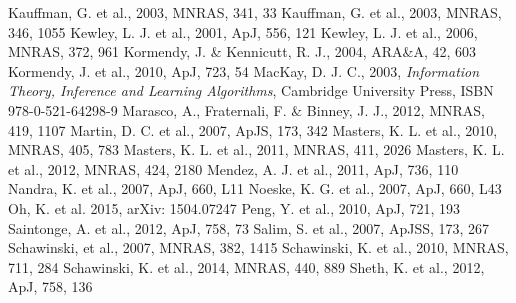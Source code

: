 \documentclass[useAMS,usenatbib]{mn2e}
\begin{document}
\begin{thebibliography}{}
 Kauffman, G. et al., 2003, MNRAS, 341, 33
 Kauffman, G. et al., 2003, MNRAS, 346, 1055
 Kewley, L. J. et al., 2001, ApJ, 556, 121
 Kewley, L. J. et al., 2006, MNRAS, 372, 961
 Kormendy, J. \& Kennicutt, R. J., 2004, ARA\&A, 42, 603
 Kormendy, J. et al., 2010, ApJ, 723, 54
 MacKay, D. J. C., 2003, \emph{Information Theory, Inference and Learning Algorithms}, Cambridge University Press, ISBN 978-0-521-64298-9
 Marasco, A., Fraternali, F. \& Binney, J. J., 2012, MNRAS, 419, 1107
 Martin, D. C. et al., 2007, ApJS, 173, 342
 Masters, K. L. et al., 2010, MNRAS, 405, 783
 Masters, K. L. et al., 2011, MNRAS, 411, 2026
 Masters, K. L. et al., 2012, MNRAS, 424, 2180
 Mendez, A. J. et al., 2011, ApJ, 736, 110
 Nandra, K. et al., 2007, ApJ, 660, L11
 Noeske, K. G. et al., 2007, ApJ, 660, L43
 Oh, K. et al. 2015, arXiv: 1504.07247
 Peng, Y. et al., 2010, ApJ, 721, 193
 Saintonge, A. et al., 2012, ApJ, 758, 73
 Salim, S. et al., 2007, ApJSS, 173, 267
 Schawinski, et al., 2007, MNRAS, 382, 1415
 Schawinski, K. et al., 2010, MNRAS, 711, 284
 Schawinski, K. et al., 2014, MNRAS, 440, 889
 Sheth, K. et al., 2012, ApJ, 758, 136


\end{thebibliography}
\end{document}
